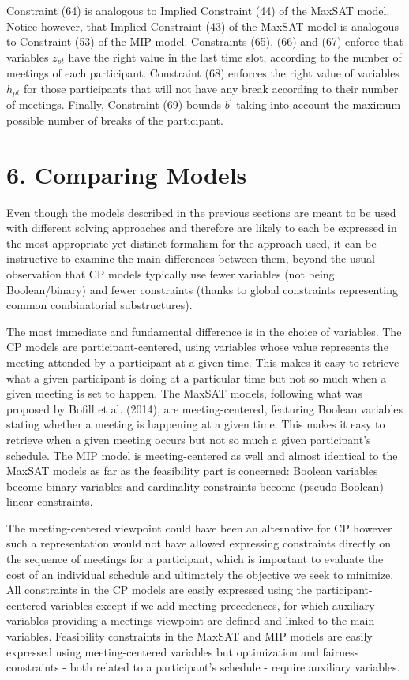 \documentclass[10pt]{article}
\begin{document}
Constraint (64) is analogous to Implied Constraint (44) of the MaxSAT model. Notice however, that Implied Constraint (43) of the MaxSAT model is analogous to Constraint (53) of the MIP model. Constraints (65), (66) and (67) enforce that variables $z_{p t}$ have the right value in the last time slot, according to the number of meetings of each participant. Constraint (68) enforces the right value of variables $h_{p t}$ for those participants that will not have any break according to their number of meetings. Finally, Constraint (69) bounds $b^{\prime}$ taking into account the maximum possible number of breaks of the participant.

\section*{6. Comparing Models}
Even though the models described in the previous sections are meant to be used with different solving approaches and therefore are likely to each be expressed in the most appropriate yet distinct formalism for the approach used, it can be instructive to examine the main differences between them, beyond the usual observation that CP models typically use fewer variables (not being Boolean/binary) and fewer constraints (thanks to global constraints representing common combinatorial substructures).

The most immediate and fundamental difference is in the choice of variables. The CP models are participant-centered, using variables whose value represents the meeting attended by a participant at a given time. This makes it easy to retrieve what a given participant is doing at a particular time but not so much when a given meeting is set to happen. The MaxSAT models, following what was proposed by Bofill et al. (2014), are meeting-centered, featuring Boolean variables stating whether a meeting is happening at a given time. This makes it easy to retrieve when a given meeting occurs but not so much a given participant's schedule. The MIP model is meeting-centered as well and almost identical to the MaxSAT models as far as the feasibility part is concerned: Boolean variables become binary variables and cardinality constraints become (pseudo-Boolean) linear constraints.

The meeting-centered viewpoint could have been an alternative for CP however such a representation would not have allowed expressing constraints directly on the sequence of meetings for a participant, which is important to evaluate the cost of an individual schedule and ultimately the objective we seek to minimize. All constraints in the CP models are easily expressed using the participant-centered variables except if we add meeting precedences, for which auxiliary variables providing a meetings viewpoint are defined and linked to the main variables. Feasibility constraints in the MaxSAT and MIP models are easily expressed using meeting-centered variables but optimization and fairness constraints - both related to a participant's schedule - require auxiliary variables.
\end{document}
